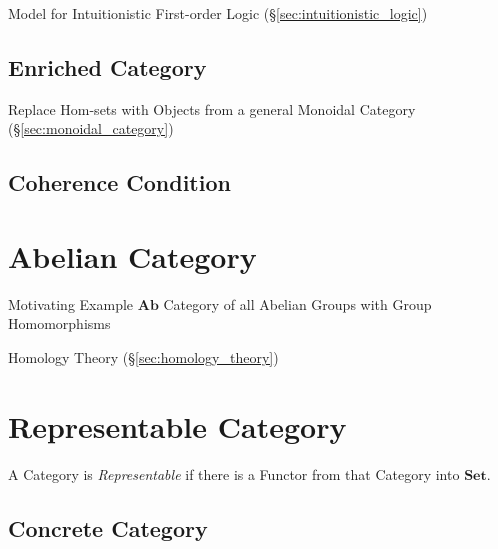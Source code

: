 Model for Intuitionistic First-order Logic
(\S\ref{sec:intuitionistic_logic})



\subsection{Enriched Category}\label{sec:enriched_category}

Replace Hom-sets with Objects from a general Monoidal Category
(\S\ref{sec:monoidal_category})



\subsection{Coherence Condition}\label{sec:coherence_condition}




\section{Abelian Category}\label{sec:abelian_category}

Motivating Example $\mathbf{Ab}$ Category of all Abelian Groups with
Group Homomorphisms

Homology Theory (\S\ref{sec:homology_theory})



\section{Representable Category}\label{sec:representable_category}

A Category is \emph{Representable} if there is a Functor from that
Category into $\mathbf{Set}$.



\subsection{Concrete Category}\label{sec:concrete_category}

